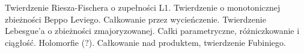 Twierdzenie Riesza-Fischera o zupełności L1.
Twierdzenie o monotonicznej zbieżności Beppo Leviego.
Całkowanie przez wycieńczenie.
Twierdzenie Lebesgue'a o zbieżności zmajoryzowanej.
Całki parametryczne, różniczkowanie i ciągłość.
Holomorfie (?).
Całkowanie nad produktem, twierdzenie Fubiniego.